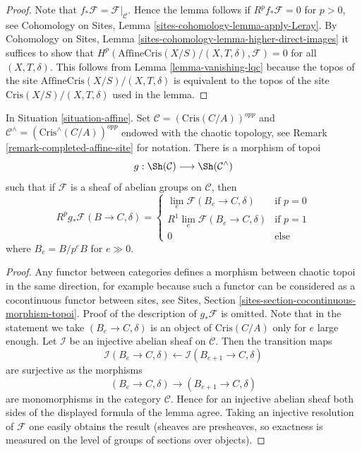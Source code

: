 \begin{proof}
\medskip\noindent
Note that $f_*\mathcal{F} = \mathcal{F}|_\mathcal{C}$. Hence the lemma
follows if $R^pf_*\mathcal{F} = 0$ for $p > 0$, see
Cohomology on Sites, Lemma \ref{sites-cohomology-lemma-apply-Leray}. By
Cohomology on Sites, Lemma \ref{sites-cohomology-lemma-higher-direct-images}
it suffices to show that
$H^p(\text{AffineCris}(X/S)/(X, T, \delta), \mathcal{F}) = 0$
for all $(X, T, \delta)$.
This follows from Lemma \ref{lemma-vanishing-lqc} because the
topos of the site $\text{AffineCris}(X/S)/(X, T, \delta)$
is equivalent to the topos of the site
$\text{Cris}(X/S)/(X, T, \delta)$ used in the lemma.
\end{proof}

\begin{lemma}
\label{lemma-complete}
In Situation \ref{situation-affine}.
Set $\mathcal{C} = (\text{Cris}(C/A))^{opp}$ and
$\mathcal{C}^\wedge = (\text{Cris}^\wedge(C/A))^{opp}$
endowed with the chaotic topology, see
Remark \ref{remark-completed-affine-site} for notation.
There is a morphism of topoi
$$
g : \Sh(\mathcal{C}) \longrightarrow \Sh(\mathcal{C}^\wedge)
$$
such that if $\mathcal{F}$ is a sheaf of abelian groups on
$\mathcal{C}$, then
$$
R^pg_*\mathcal{F}(B \to C, \delta) =
\left\{
\begin{matrix}
\lim_e \mathcal{F}(B_e \to C, \delta) & \text{if }p = 0 \\
R^1\lim_e \mathcal{F}(B_e \to C, \delta) & \text{if }p = 1 \\
0 & \text{else}
\end{matrix}
\right.
$$
where $B_e = B/p^eB$ for $e \gg 0$.
\end{lemma}

\begin{proof}
Any functor between categories defines a morphism between chaotic
topoi in the same direction, for example because such a functor
can be considered as a cocontinuous functor between sites, see
Sites, Section \ref{sites-section-cocontinuous-morphism-topoi}.
Proof of the description of $g_*\mathcal{F}$ is omitted.
Note that in the statement we take $(B_e \to C, \delta)$
is an object of $\text{Cris}(C/A)$  only for $e$ large enough.
Let $\mathcal{I}$ be an injective abelian sheaf on $\mathcal{C}$.
Then the transition maps
$$
\mathcal{I}(B_e \to C, \delta) \leftarrow
\mathcal{I}(B_{e + 1} \to C, \delta)
$$
are surjective as the morphisms
$$
(B_e \to C, \delta)
\longrightarrow
(B_{e + 1} \to C, \delta)
$$
are monomorphisms in the category $\mathcal{C}$. Hence for an injective
abelian sheaf both sides of the displayed formula of the lemma agree.
Taking an injective resolution of $\mathcal{F}$ one easily obtains
the result (sheaves are presheaves, so exactness is measured on the
level of groups of sections over objects).
\end{proof}

